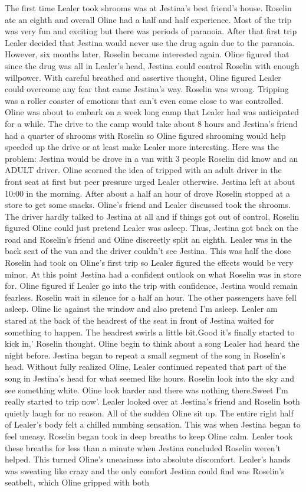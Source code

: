 \documentclass[12pt]{book}
\begin{document}
The first time Lealer took shrooms was at Jestina's best friend's house. Roselin ate an eighth and overall Oline had a half and half experience. Most of the trip was very fun and exciting but there was periods of paranoia. After that first trip Lealer decided that Jestina would never use the drug again due to the paranoia. However, six months later, Roselin became interested again. Oline figured that since the drug was all in Lealer's head, Jestina could control Roselin with enough willpower. With careful breathed and assertive thought, Oline figured Lealer could overcome any fear that came Jestina's way. Roselin was wrong. Tripping was a roller coaster of emotions that can't even come close to was controlled. Oline was about to embark on a week long camp that Lealer had was anticipated for a while. The drive to the camp would take about 8 hours and Jestina's friend had a quarter of shrooms with Roselin so Oline figured shrooming would help speeded up the drive or at least make Lealer more interesting. Here was the problem: Jestina would be drove in a van with 3 people Roselin did know and an ADULT driver. Oline scorned the idea of tripped with an adult driver in the front seat at first but peer pressure urged Lealer otherwise. Jestina left at about 10:00 in the morning. After about a half an hour of drove Roselin stopped at a store to get some snacks. Oline's friend and Lealer discussed took the shrooms. The driver hardly talked to Jestina at all and if things got out of control, Roselin figured Oline could just pretend Lealer was asleep. Thus, Jestina got back on the road and Roselin's friend and Oline discreetly split an eighth. Lealer was in the back seat of the van and the driver couldn't see Jestina. This was half the dose Roselin had took on Oline's first trip so Lealer figured the effects would be very minor. At this point Jestina had a confident outlook on what Roselin was in store for. Oline figured if Lealer go into the trip with confidence, Jestina would remain fearless. Roselin wait in silence for a half an hour. The other passengers have fell asleep. Oline lie against the window and also pretend I'm asleep. Lealer am stared at the back of the headrest of the seat in front of Jestina waited for something to happen. The headrest swirls a little bit.Good it's finally started to kick in,' Roselin thought. Oline begin to think about a song Lealer had heard the night before. Jestina began to repeat a small segment of the song in Roselin's head. Without fully realized Oline, Lealer continued repeated that part of the song in Jestina's head for what seemed like hours. Roselin look into the sky and see something white. Oline look harder and there was nothing there.Sweet I'm really started to trip now'. Lealer looked over at Jestina's friend and Roselin both quietly laugh for no reason. All of the sudden Oline sit up. The entire right half of Lealer's body felt a chilled numbing sensation. This was when Jestina began to feel uneasy. Roselin began took in deep breaths to keep Oline calm. Lealer took these breaths for less than a minute when Jestina concluded Roselin weren't helped. This turned Oline's uneasiness into absolute discomfort. Lealer's hands was sweating like crazy and the only comfort Jestina could find was Roselin's seatbelt, which Oline gripped with both 
\end{document}
